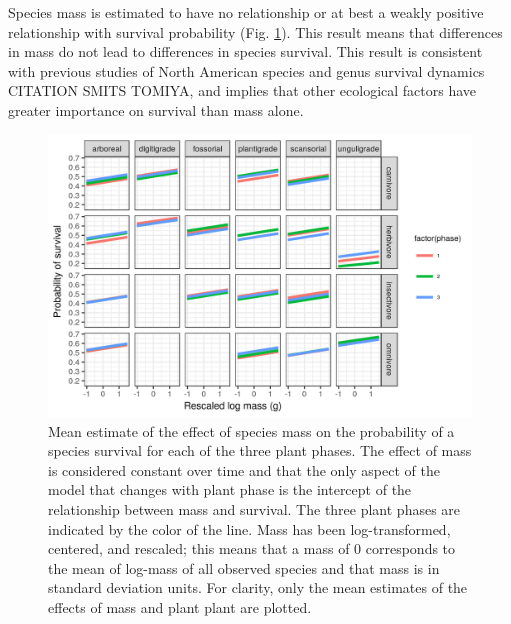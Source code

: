 \documentclass[12pt,letterpaper]{article}
\begin{document}
Species mass is estimated to have no relationship or at best a weakly positive relationship with survival probability (Fig. \ref{fig:mass_survival}). This result means that differences in mass do not lead to differences in species survival. This result is consistent with previous studies of North American species and genus survival dynamics CITATION SMITS TOMIYA, and implies that other ecological factors have greater importance on survival than mass alone.
\begin{figure}[ht]
  \centering
  \includegraphics[width=\textwidth,height=0.4\textheight,keepaspectratio=true]{figure/mass_on_surv_bd}
  \caption[Effect of mass on probability of species survival as estimated from the birth-death model]{Mean estimate of the effect of species mass on the probability of a species survival for each of the three plant phases. The effect of mass is considered constant over time and that the only aspect of the model that changes with plant phase is the intercept of the relationship between mass and survival. The three plant phases are indicated by the color of the line. Mass has been log-transformed, centered, and rescaled; this means that a mass of 0 corresponds to the mean of log-mass of all observed species and that mass is in standard deviation units. For clarity, only the mean estimates of the effects of mass and plant plant are plotted.}
  \label{fig:mass_survival}
\end{figure}
\end{document}

